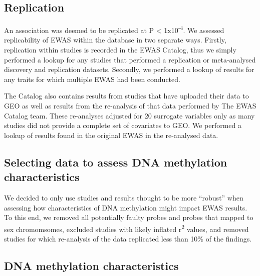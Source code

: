 \documentclass[11pt,oneside]{bristolthesis}
\begin{document}
\hypertarget{replication}{%
\subsection{Replication}\label{replication}}

An association was deemed to be replicated at P \textless{} 1x10\textsuperscript{-4}. We assessed replicability of EWAS within the database in two separate ways. Firstly, replication within studies is recorded in the EWAS Catalog, thus we simply performed a lookup for any studies that performed a replication or meta-analysed discovery and replication datasets. Secondly, we performed a lookup of results for any traits for which multiple EWAS had been conducted.

The Catalog also contains results from studies that have uploaded their data to GEO as well as results from the re-analysis of that data performed by The EWAS Catalog team. These re-analyses adjusted for 20 surrogate variables only as many studies did not provide a complete set of covariates to GEO. We performed a lookup of results found in the original EWAS in the re-analysed data.

\hypertarget{selecting-data-to-assess-dna-methylation-characteristics}{%
\subsection{Selecting data to assess DNA methylation characteristics}\label{selecting-data-to-assess-dna-methylation-characteristics}}

We decided to only use studies and results thought to be more ``robust'' when assessing how characteristics of DNA methylation might impact EWAS results. To this end, we removed all potentially faulty probes and probes that mapped to sex chromomsomes, excluded studies with likely inflated r\textsuperscript{2} values, and removed studies for which re-analysis of the data replicated less than 10\% of the findings.

\hypertarget{dna-methylation-characteristics}{%
\subsection{DNA methylation characteristics}\label{dna-methylation-characteristics}}
\end{document}
